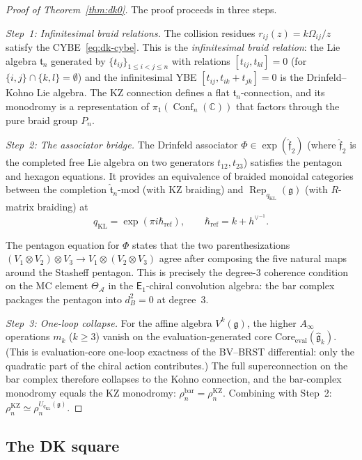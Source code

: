 \documentclass[11pt,reqno]{amsart}
\theoremstyle{definition}
\theoremstyle{remark}
\newcommand{\cA}{\mathcal{A}}
\newcommand{\Ainf}{A_{\infty}}
\newcommand{\Eone}{\mathsf{E}_{1}}
\DeclareMathOperator{\Conf}{Conf}
\DeclareMathOperator{\Rep}{Rep}
\newcommand{\fg}{\mathfrak{g}}
\newcommand{\ft}{\mathfrak{t}}
\newcommand{\CC}{\mathbb{C}}
\newcommand{\kp}{k + h^{\vee}}
\numberwithin{equation}{section}
\begin{document}
\begin{proof}[Proof of Theorem~\textup{\ref{thm:dk0}}]
The proof proceeds in three steps.

\emph{Step~1: Infinitesimal braid relations.}
The collision residues $r_{ij}(z) = k\Omega_{ij}/z$
satisfy the CYBE~\eqref{eq:dk-cybe}.  This is the
\emph{infinitesimal braid relation}: the Lie algebra
$\ft_n$ generated by $\{t_{ij}\}_{1 \leq i < j \leq n}$
with relations $[t_{ij}, t_{kl}] = 0$ (for
$\{i,j\} \cap \{k,l\} = \emptyset$) and the
infinitesimal YBE
$[t_{ij}, t_{ik} + t_{jk}] = 0$
is the Drinfeld--Kohno Lie algebra.  The KZ connection
defines a flat $\ft_n$-connection, and its monodromy is a
representation of $\pi_1(\Conf_n(\CC))$ that factors
through the pure braid group $P_n$.

\emph{Step~2: The associator bridge.}
The Drinfeld associator
$\Phi \in \exp(\hat{\mathfrak{f}}_2)$
(where $\hat{\mathfrak{f}}_2$ is the completed free Lie
algebra on two generators $t_{12}, t_{23}$) satisfies the
pentagon and hexagon equations.  It provides an equivalence
of braided monoidal categories between the completion
$\hat{\ft}_n\text{-}\mathrm{mod}$
(with KZ braiding) and $\Rep_{q_{\mathrm{KL}}}(\fg)$ (with $R$-matrix
braiding) at
\[
q_{\mathrm{KL}}=\exp(\pi i\hbar_{\mathrm{ref}}),
\qquad
\hbar_{\mathrm{ref}}=\kp^{-1}.
\]

The pentagon equation for $\Phi$ states
that the two parenthesizations
$(V_1 \otimes V_2) \otimes V_3
\to V_1 \otimes (V_2 \otimes V_3)$
agree after composing the five natural maps around the
Stasheff pentagon.  This is precisely the degree-$3$
coherence condition on the MC element $\Theta_\cA$ in the
$\Eone$-chiral convolution algebra: the bar complex
packages the pentagon into $d_B^2 = 0$ at degree~$3$.

\emph{Step~3: One-loop collapse.}
For the affine algebra $V^k(\fg)$, the higher $\Ainf$
operations $m_k$ ($k \geq 3$) vanish on the
evaluation-generated core
${\mathrm{Core}}_{\mathrm{eval}}(\widehat{\mathfrak{g}}_k)$.
(This is evaluation-core one-loop exactness of the BV--BRST
differential: only the quadratic part of the chiral action
contributes.)  The full superconnection on the bar complex
therefore collapses to the Kohno connection, and the
bar-complex monodromy equals the KZ monodromy:
$\rho_n^{\mathrm{bar}} = \rho_n^{\mathrm{KZ}}$.
Combining with Step~2:
$\rho_n^{\mathrm{KZ}} \simeq \rho_n^{U_{q_{\mathrm{KL}}}(\fg)}$.
\end{proof}

\subsection{The DK square}
\end{document}
